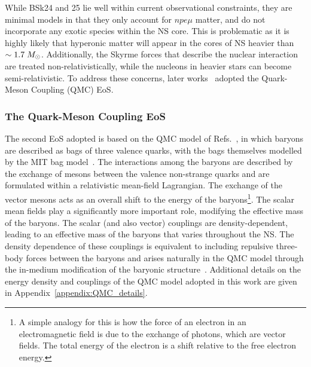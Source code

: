 While BSk24 and 25 lie well within current observational constraints, they are minimal models in that they only account for $npe\mu$ matter, and do not incorporate any exotic species within the NS core. This is problematic as it is highly likely that hyperonic matter will appear in the cores of NS heavier than $\sim 1.7\;M_\odot$.  Additionally, the Skyrme forces that describe the nuclear interaction are treated non-relativistically, while the nucleons in heavier stars can become semi-relativistic. To address these concerns, later works~\cite{Anzuini:2021lnv_nov_Improvedtreatmentdark, Bell:2023ysh_dec_ThermalizationAnnihilationDark} adopted the Quark-Meson Coupling (QMC) EoS.



\subsubsection*{The Quark-Meson Coupling EoS}

The second EoS adopted is based on the QMC model of Refs.~\cite{Guichon:1987jp_Possiblequarkmechanism,Guichon:1995ue_Rolenucleonstructure, Saito:2005rv_Nucleonhadronstructure,Guichon:2018uew_QuarkMesonCouplingQMC}, in which baryons are described as bags of three valence quarks, with the bags themselves modelled by the MIT bag model~\cite{Chodos:1974pn_Baryonstructurebag}. The interactions among the baryons are described by the exchange of mesons between the valence non-strange quarks and are formulated within a relativistic mean-field Lagrangian. The exchange of the vector mesons acts as an overall shift to the energy of the baryons\footnote{A simple analogy for this is how the force of an electron in an electromagnetic field is due to the exchange of photons, which are vector fields. The total energy of the electron is a shift relative to the free electron energy.}. The scalar mean fields play a significantly more important role, modifying the effective mass of the baryons. The scalar (and also vector) couplings are density-dependent, leading to an effective mass of the baryons that varies throughout the NS. The density dependence of these couplings is equivalent to including repulsive three-body forces between the baryons and arises naturally in the QMC model through the in-medium modification of the baryonic structure~\cite{Guichon:2004xg_Quarkstructurenuclear,Thomas:2021kio_jul_Rolequarksnuclear}. Additional details on the energy density and couplings of the QMC model adopted in this work are given in Appendix~\ref{appendix:QMC_details}.

